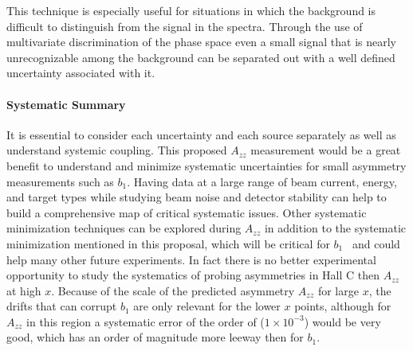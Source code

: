 This technique is especially useful for situations in which the background
is difficult to distinguish from the signal in the spectra.  Through the use of multivariate
discrimination of the phase space even a small signal that is nearly
unrecognizable among the background can be separated out with a well defined
uncertainty associated with it.
\fi

\paragraph{Systematic Summary}\mbox{}


It is essential to consider each uncertainty and each source separately as well as understand systemic coupling.  
This proposed $A_{zz}$ measurement would be a great benefit to understand and minimize systematic uncertainties for small asymmetry measurements such as $b_1$. Having data at a large range of beam
current, energy, and target types while studying beam noise and detector stability can help to build a comprehensive map of critical systematic issues. Other systematic minimization techniques can be explored during $A_{zz}$ in addition to the systematic minimization mentioned in this proposal, which will be critical for $b_1$~\cite{Keller:2015tn} and could help many other future experiments. In fact there is no better experimental opportunity to study the systematics of probing asymmetries in Hall C then $A_{zz}$ at high $x$. Because of the scale of the predicted asymmetry $A_{zz}$ for large $x$, the drifts that can corrupt
$b_1$ are only relevant for the lower $x$ points, although for $A_{zz}$ in this region a systematic error of the order of ($1\times10^{-3}$) would be very good, which has an order of magnitude more leeway
then for $b_1$. 


